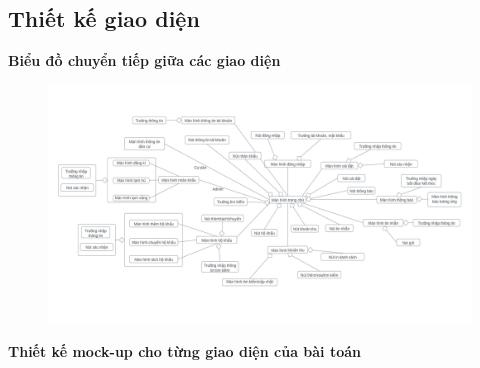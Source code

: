 \documentclass{article}
\begin{document}
\subsection{Thiết kế giao diện}
\textbf{Biểu đồ chuyển tiếp giữa các giao diện}
    \begin{figure}[H]
        \centering
        \includegraphics[width=1\textwidth]{Ảnh chương 4/Presentation1.png}
    \end{figure}
\textbf{Thiết kế mock-up cho từng giao diện của bài toán}
\end{document}
